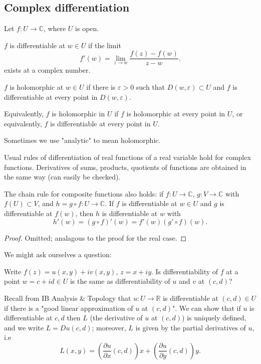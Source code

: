 \documentclass[a4paper]{scrartcl}
\begin{document}
\subsection{Complex differentiation}
Let $f: U \rightarrow \mathbb{C}$, where $U$ is open. 
\begin{definition}[Differentiability]
     $f$ is differentiable at $w \in U$ if the limit \[
     f' (w)=\lim_{z \rightarrow w} \frac{f (z)-f (w)}{z-w}
     .\] exists at a complex number.
\end{definition}
\begin{definition}
     $f$ is holomorphic at $w \in U$ if there is $\varepsilon >0$ such that $D (w, \varepsilon)\subset U$ and $f$ is differentiable at every point in $D (w, \varepsilon)$. 

     Equivalently, $f$ is holomorphic in $U$ if $f$ is holomorphic at every point in $U$, or equivalently, $f$ is differentiable at every point in $U$.
\end{definition}
\begin{remark}
     Sometimes we use "analytic" to mean holomorphic.
\end{remark}
Usual rules of differentiation of real functions of a real variable hold for complex functions. Derivatives of sums, products, quotients of functions are obtained in the same way (can easily be checked). 

\begin{proposition}
     The chain rule for composite functions also holds: if $f: U \rightarrow \mathbb{C}$, $g: V \rightarrow \mathbb{C}$ with $f (U) \subset V$, and $h= g \circ f : U \rightarrow \mathbb{C}$. If $f$ is differentiable at $w \in U$ and $g$ is differentiable at $f (w)$, then $h$ is differentiable at $w$ with \[
     h' (w)=(g \circ f)' (w)= f' (w) (g' \circ f)(w)
     .\] 
\end{proposition}
\begin{proof}
     Omitted; analagous to the proof for the real case.
\end{proof}
We might ask ourselves a question: 

Write $f (z)= u (x,y)+iv (x,y)$, $z=x+iy$. Is differentiability of $f$ at a point $w=c+id \in U$ is the same as differentiability of $u $ and $v$ at $(c,d)$? 

Recall from IB Analysis \& Topology that $u : U \rightarrow \mathbb{R}$ is differentiable at $(c,d) \in U$ if there is a "good linear approximation of $u$ at $(c,d)$". We can show that if  $u$ is differentiable at $c,d$ then $L$ (the derivative of $u$ at $(c,d)$) is uniquely defined, and we write $L=Du (c,d)$; moreover, $L$ is given by the partial derivatives of $u$, i.e \[
L (x,y)= \left(\frac{\partial u}{\partial x} (c,d)\right)x + \left( \frac{\partial u}{\partial y}(c,d)\right)y
.\]  
\end{document}
